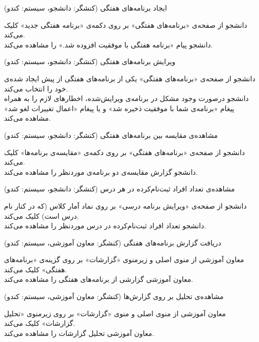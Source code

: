 \documentclass{report}
\begin{document}
\textbf{}
 ایجاد برنامه‌های هفتگی (کنشگر: دانشجو، سیستم: کندو)
 \begin{addmargin}[.84cm]{0cm}
دانشجو از صفحه‌ی «برنامه‌های هفتگی» بر روی دکمه‌ی «برنامه‌ هفتگی جدید» کلیک می‌کند.\\
دانشجو پیام «برنامه هفتگی با موفقیت افزوده شد.» را مشاهده می‌کند.
\end{addmargin}


\textbf{}
ویرایش برنامه‌های هفتگی (کنشگر: دانشجو، سیستم: کندو)
 \begin{addmargin}[.84cm]{0cm}
دانشجو از صفحه‌ی «برنامه‌های هفتگی»  یکی از برنامه‌های هفتگی از پیش ایجاد شده‌ی خود را انتخاب می‌کند.\\
دانشجو درصورت وجود مشکل در برنامه‌ی ویرایش‌شده، اخطار‌های لازم را به همراه پیغام «برنامه‌ی شما با موفقیت ذخیره شد» و یا  پیغام «اعمال تغییرات لغو شد» مشاهده می‌کند.
\end{addmargin}

\textbf{}
مشاهده‌ی مقایسه بین برنامه‌های هفتگی (کنشگر: دانشجو، سیستم: کندو)
\begin{addmargin}[.84cm]{0cm}
دانشجو از صفحه‌ی «برنامه‌های هفتگی» بر روی دکمه‌ی «مقایسه‌ی برنامه‌ها» کلیک می‌کند.\\
دانشجو گزارش مقایسه‌ی دو برنامه‌ی موردنظر را مشاهده می‌کند.
\end{addmargin}

\textbf{}
مشاهده‌ی تعداد افراد ثبت‌نام‌کرده در هر درس (کنشگر: دانشجو، سیستم: کندو)
 \begin{addmargin}[.84cm]{0cm}
دانشجو از صفحه‌ی «ویرایش برنامه درسی» بر روی نماد آمار کلاس (که در کنار نام درس است) کلیک می‌کند.\\
دانشجو تعداد افراد ثبت‌نام‌کرده در درس ‌‌مورد‌نظر را مشاهده می‌کند.
\end{addmargin}
\clearpage
\textbf{}
دریافت گزارش برنامه‌های هفتگی (کنشگر: معاون آموزشی، سیستم: کندو)
 \begin{addmargin}[.84cm]{0cm}
معاون آموزشی از منوی اصلی و زیرمنوی «گزارشات» بر روی گزینه‌ی «برنامه‌های هفتگی» کلیک می‌کند.\\
معاون آموزشی گزارشی از برنامه‌های هفتگی را مشاهده می‌کند.
\end{addmargin}


\textbf{}
مشاهده‌ی تحلیل بر روی گزارش‌ها (کنشگر: معاون آموزشی، سیستم: کندو)
 \begin{addmargin}[.84cm]{0cm}
معاون آموزشی از منوی اصلی و منوی «گزارشات» بر روی زیرمنوی «تحلیل گزارشات» کلیک می‌کند.\\
معاون آموزشی تحلیل گزارشات را مشاهده می‌کند.
\end{addmargin}
\end{document}
